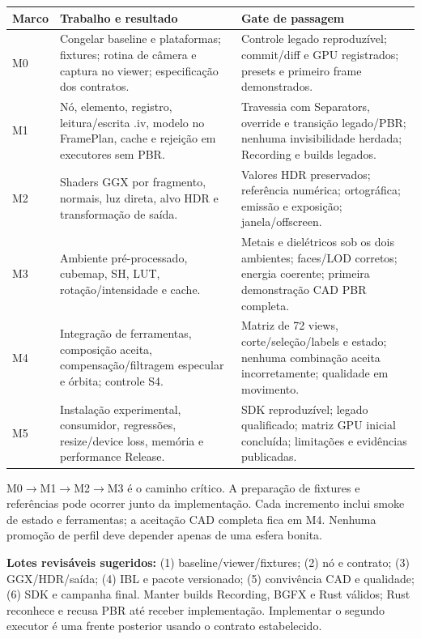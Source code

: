 \documentclass[11pt,a4paper]{article}
\begin{document}
\begin{longtable}{P{.08\linewidth}P{.40\linewidth}P{.42\linewidth}}
\toprule Marco & Trabalho e resultado & Gate de passagem\\\midrule\endhead
M0 & Congelar baseline e plataformas; fixtures; rotina de câmera e captura no viewer; especificação dos contratos. & Controle legado reproduzível; commit/diff e GPU registrados; presets e primeiro frame demonstrados.\\
M1 & Nó, elemento, registro, leitura/escrita .iv, modelo no FramePlan, cache e rejeição em executores sem PBR. & Travessia com Separators, override e transição legado/PBR; nenhuma invisibilidade herdada; Recording e builds legados.\\
M2 & Shaders GGX por fragmento, normais, luz direta, alvo HDR e transformação de saída. & Valores HDR preservados; referência numérica; ortográfica; emissão e exposição; janela/offscreen.\\
M3 & Ambiente pré-processado, cubemap, SH, LUT, rotação/intensidade e cache. & Metais e dielétricos sob os dois ambientes; faces/LOD corretos; energia coerente; primeira demonstração CAD PBR completa.\\
M4 & Integração de ferramentas, composição aceita, compensação/filtragem especular e órbita; controle S4. & Matriz de 72 views, corte/seleção/labels e estado; nenhuma combinação aceita incorretamente; qualidade em movimento.\\
M5 & Instalação experimental, consumidor, regressões, resize/device loss, memória e performance Release. & SDK reproduzível; legado qualificado; matriz GPU inicial concluída; limitações e evidências publicadas.\\\bottomrule
\end{longtable}

M0$\rightarrow$M1$\rightarrow$M2$\rightarrow$M3 é o caminho crítico. A preparação de fixtures e referências pode ocorrer junto da implementação. Cada incremento inclui smoke de estado e ferramentas; a aceitação CAD completa fica em M4. Nenhuma promoção de perfil deve depender apenas de uma esfera bonita.

\textbf{Lotes revisáveis sugeridos:} (1) baseline/viewer/fixtures; (2) nó e contrato; (3) GGX/HDR/saída; (4) IBL e pacote versionado; (5) convivência CAD e qualidade; (6) SDK e campanha final. Manter builds Recording, BGFX e Rust válidos; Rust reconhece e recusa PBR até receber implementação. Implementar o segundo executor é uma frente posterior usando o contrato estabelecido.
\end{document}
